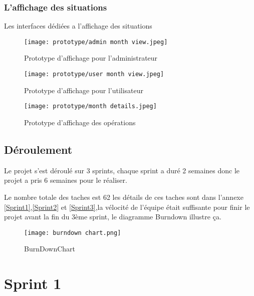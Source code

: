\subsubsection{L'affichage des situations}
Les interfaces dédiées a l'affichage des situations
\begin{figure}[h!]
    \begin{minipage}[t]{0.25\textwidth}    %
            \texttt{[image: prototype/admin month view.jpeg]}
            \caption{ Prototype d'affichage pour l'administrateur}
      \end{minipage}%
      \begin{minipage}{0.10\textwidth}
        \hfill
      \end{minipage}
    \begin{minipage}[t]{0.25\textwidth}
            \texttt{[image: prototype/user month view.jpeg]}
            \caption{ Prototype d'affichage pour l'utilisateur}
    \end{minipage}%
    \begin{minipage}{0.10\textwidth}
        \hfill
    \end{minipage}
      \begin{minipage}[t]{0.25\textwidth}
            \texttt{[image: prototype/month details.jpeg]}
            \caption{ Prototype d'affichage des opérations}
    \end{minipage}
    \end{figure}
    \newpage
    \subsection{Déroulement}
    Le projet s'est déroulé sur 3 sprints, chaque sprint a duré 2 semaines donc le projet a pris 6 semaines pour le réaliser.
    
    
    
    Le nombre totale des taches est 62 les détails de ces taches sont dans l'annexe \ref{Sprint1},\ref{Sprint2} et \ref{Sprint3},la vélocité de l'équipe était suffisante pour finir le projet avant la fin du 3ème sprint, le diagramme Burndown illustre ça.
    \begin{figure}[h]
      \centering
      \texttt{[image: burndown chart.png]}
      \caption{BurnDownChart}
  \end{figure}


\section{Sprint 1}
